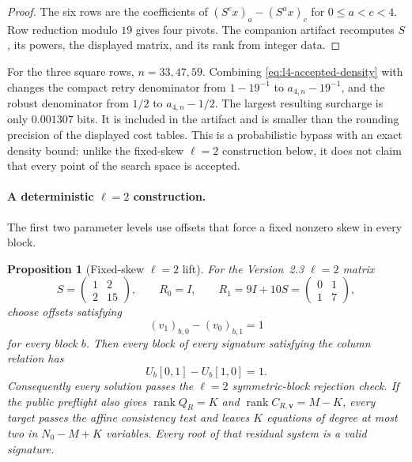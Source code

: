 \documentclass[11pt]{article}
\newtheorem{proposition}[proposition]{Proposition}
\newcommand{\rank}{\operatorname{rank}}
\begin{document}
\begin{proof}
The six rows are the coefficients of
$(S^cx)_a-(S^ax)_c$ for $0\le a<c<4$.  Row reduction modulo $19$ gives four
pivots.  The companion artifact recomputes $S$, its powers, the displayed
matrix, and its rank from integer data.
\end{proof}

For the three square rows, $n=33,47,59$.  Combining
\eqref{eq:l4-accepted-density} with  changes the
compact retry denominator from $1-19^{-1}$ to $a_{4,n}-19^{-1}$, and the
robust denominator from $1/2$ to $a_{4,n}-1/2$.  The largest resulting
surcharge is only $0.001307$ bits.  It is included in the artifact and is
smaller than the rounding precision of the displayed cost tables.  This is a
probabilistic bypass with an exact density bound: unlike the fixed-skew
$\ell=2$ construction below, it does not claim that every point of the search
space is accepted.

\paragraph{A deterministic $\ell=2$ construction.}
The first two parameter levels use offsets that force a fixed nonzero skew in
every block.

\begin{proposition}[Fixed-skew $\ell=2$ lift]\label{prop:fixed-skew}
For the Version~2.3 $\ell=2$ matrix
\[
 S=\begin{pmatrix}1&2\\2&15\end{pmatrix},
 \qquad R_0=I,
 \qquad R_1=9I+10S=\begin{pmatrix}0&1\\1&7\end{pmatrix},
\]
choose offsets satisfying
\begin{equation}\label{eq:fixed-skew-offset}
 (v_1)_{b,0}-(v_0)_{b,1}=1
\end{equation}
for every block $b$.  Then every block of every signature satisfying the
column relation has
\begin{equation}\label{eq:fixed-skew-identity}
 U_b[0,1]-U_b[1,0]=1.
\end{equation}
Consequently every solution passes the $\ell=2$ symmetric-block rejection
check.  If the public preflight also gives
$\rank Q_R=K$ and $\rank C_{R,\mathbf v}=M-K$, every target passes the
affine consistency test and leaves $K$ equations of degree at most two in
$N_0-M+K$ variables.  Every root of that residual system is a valid signature.
\end{proposition}
\end{document}
